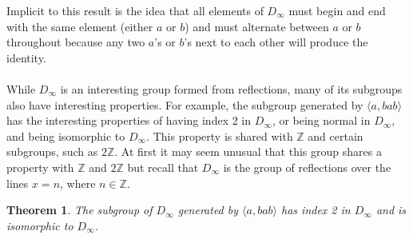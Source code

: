 \documentclass{article}
\newtheorem{theorem}{Theorem}
\theoremstyle{definition}
\begin{document}
\noindent Implicit to this result is the idea that all elements of $D_{\infty}$ must begin and end with the same element (either $a$ or $b$) and must alternate between $a$ or $b$ throughout because any two $a$'s or $b$'s next to each other will produce the identity.\\
\\
While $D_{\infty}$ is an interesting group formed from reflections, many of its subgroups also have interesting properties. For example, the subgroup generated by $\langle a,bab \rangle$ has the interesting properties of having index 2 in $D_{\infty}$, or being normal in $D_{\infty}$, and being isomorphic to $D_{\infty}$. This property is shared with $\mathbb{Z}$ and certain subgroups, such as $2\mathbb{Z}$. At first it may seem unusual that this group shares a property with $\mathbb{Z}$ and $2\mathbb{Z}$ but recall that $D_\infty$ is the group of reflections over the lines $x=n$, where $n \in \mathbb{Z}$.\\
 
\begin{theorem}
    The subgroup of $D_{\infty}$ generated by $\langle a,bab \rangle$ has index 2 in $D_{\infty}$ and is isomorphic to $D_{\infty}$.
\end{theorem}
\end{document}
